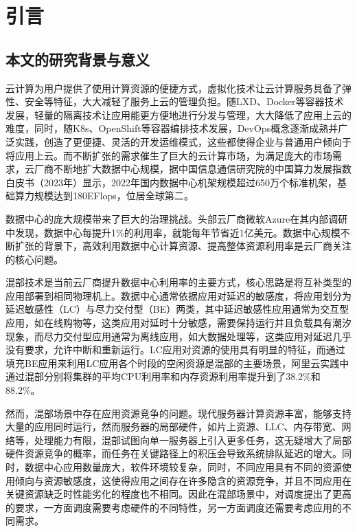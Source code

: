 \chapter{引言}\label{chap:introduction}

\section{本文的研究背景与意义}


云计算为用户提供了使用计算资源的便捷方式，虚拟化技术让云计算服务具备了弹性、安全等特征，大大减轻了服务上云的管理负担。随LXD、Docker等容器技术发展，轻量的隔离技术让应用能更方便地进行分发与管理，大大降低了应用上云的难度，同时，随K8s、OpenShift等容器编排技术发展，DevOps概念逐渐成熟并广泛实践，创造了更便捷、灵活的开发运维模式，这些都使得企业与普通用户倾向于将应用上云。而不断扩张的需求催生了巨大的云计算市场，为满足庞大的市场需求，云厂商不断地扩大数据中心规模，据中国信息通信研究院的中国算力发展指数白皮书（2023年）显示，2022年国内数据中心机架规模超过650万个标准机架，基础算力规模达到180EFlops，位居全球第二\citep{chinaict2023}。

数据中心的庞大规模带来了巨大的治理挑战。头部云厂商微软Azure在其内部调研中发现，数据中心每提升1\%的利用率，就能每年节省近1亿美元\citep{hadary2020protean}。数据中心规模不断扩张的背景下，高效利用数据中心计算资源、提高整体资源利用率是云厂商关注的核心问题。

混部技术是当前云厂商提升数据中心利用率的主要方式，核心思路是将互补类型的应用部署到相同物理机上。数据中心通常依据应用对延迟的敏感度，将应用划分为延迟敏感性（LC）与尽力交付型（BE）两类，其中延迟敏感性应用通常为交互型应用，如在线购物等，这类应用对延时十分敏感，需要保持运行并且负载具有潮汐现象，而尽力交付型应用通常为离线应用，如大数据处理等，这类应用对延迟几乎没有要求，允许中断和重新运行。LC应用对资源的使用具有明显的特征，而通过填充BE应用来利用LC应用各个时段的空闲资源是混部的主要场景，阿里云实践中通过混部分别将集群的平均CPU利用率和内存资源利用率提升到了38.2\%和88.2\%\citep{guo2019limits}。

然而，混部场景中存在应用资源竞争的问题。现代服务器计算资源丰富，能够支持大量的应用同时运行，然而服务器的局部硬件，如片上资源、LLC、内存带宽、网络等，处理能力有限，混部试图向单一服务器上引入更多任务，这无疑增大了局部硬件资源竞争的概率，而任务在关键路径上的积压会导致系统排队延迟的增大。同时，数据中心应用数量庞大，软件环境较复杂，同时，不同应用具有不同的资源使用倾向与资源敏感度，这使得应用之间存在许多隐含的资源竞争，并且不同应用在关键资源缺乏时性能劣化的程度也不相同。因此在混部场景中，对调度提出了更高的要求，一方面调度需要考虑硬件的不同特性，另一方面调度还需要考虑应用的不同需求。

